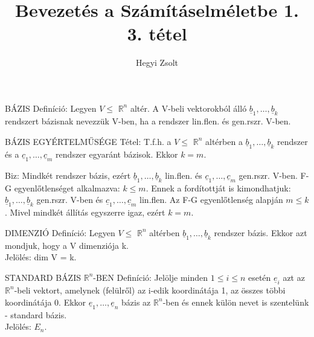 \documentclass[]{article}
\title{Bevezetés a Számításelméletbe 1.\\{\large 3. tétel}}
\author{Hegyi Zsolt}
\newcommand{\Rn}[1]{$\mathbb{R}^{#1}$}
\newcommand{\Und}[1]{\underline{#1}}
\begin{document}
\maketitle{}
\begin{shaded}
BÁZIS Definíció: Legyen $V \leq$ \Rn{n} altér. A V-beli vektorokból álló $\Und{b}_1,\ldots,\Und{b}_k$ rendszert bázisnak nevezzük V-ben, ha a rendszer lin.flen. és gen.rszr. V-ben.
\end{shaded}
\begin{framed}
BÁZIS EGYÉRTELMŰSÉGE Tétel: T.f.h. a $V \leq$ \Rn{n} altérben a $\Und{b}_1,\ldots,\Und{b}_k$ rendszer és a $\Und{c}_1,\ldots,\Und{c}_m$ rendszer egyaránt bázisok. Ekkor $k = m$.
\end{framed}
\begin{leftbar}
Biz: Mindkét rendszer bázis, ezért $\Und{b}_1,\ldots,\Und{b}_k$ lin.flen. és $\Und{c}_1,\ldots,\Und{c}_m$ gen.rszr. V-ben. F-G egyenlőtlenséget alkalmazva: $k \leq m$. Ennek a fordítottját is kimondhatjuk: $\Und{b}_1,\ldots,\Und{b}_k$ gen.rszr. V-ben és $\Und{c}_1,\ldots,\Und{c}_m$ lin.flen. Az F-G egyenlőtlenség alapján $m \leq k$. Mivel mindkét állítás egyszerre igaz, ezért $k = m$.
\end{leftbar}
\begin{shaded}
DIMENZIÓ Definíció: Legyen $V \leq$ \Rn{n} altérben $\Und{b}_1,\ldots,\Und{b}_k$ rendszer bázis. Ekkor azt mondjuk, hogy a V dimenziója k.\\
Jelölés: dim V = k.
\end{shaded}
\begin{shaded}
STANDARD BÁZIS \Rn{n}-BEN Definíció: Jelölje minden $1 \leq i \leq n$ esetén $\Und{e}_i$ azt az \Rn{n}-beli vektort, amelynek (felülről) az i-edik koordinátája 1, az összes többi koordinátája 0. Ekkor $\Und{e}_1,\ldots,\Und{e}_n$ bázis az \Rn{n}-ben és ennek külön nevet is szentelünk - standard bázis.\\Jelölés: $E_n$.
\end{shaded}
\end{document}
